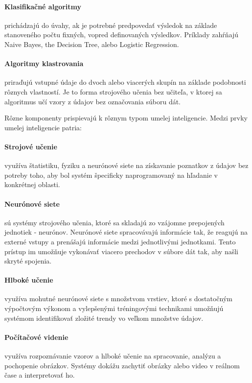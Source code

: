 \paragraph{Klasifikačné algoritmy} prichádzajú do úvahy, ak je potrebné predpovedať výsledok na základe stanoveného počtu fixných, vopred definovaných výsledkov. Príklady zahŕňajú Naive Bayes, the Decision Tree, alebo Logistic Regression.

\paragraph{Algoritmy klastrovania} priraďujú vstupné údaje do dvoch alebo viacerých skupín na základe podobnosti rôznych vlastností. Je to forma strojového učenia bez učiteľa, v ktorej sa algoritmus učí vzory z údajov bez označovania súboru dát.

Rôzne komponenty prispievajú k rôznym typom umelej inteligencie. Medzi prvky umelej inteligencie patria:
\paragraph{Strojové učenie} využíva štatistiku, fyziku a neurónové siete na získavanie poznatkov z údajov bez potreby toho, aby bol systém špecificky naprogramovaný na hľadanie v konkrétnej oblasti.

\paragraph{Neurónové siete} sú systémy strojového učenia, ktoré sa skladajú zo vzájomne prepojených jednotiek - neurónov. Neurónové siete spracovávajú informácie tak, že reagujú na externé vstupy a prenášajú informácie medzi jednotlivými jednotkami. Tento prístup im umožňuje vykonávať viacero prechodov v súbore dát tak, aby našli skryté spojenia.

\paragraph{Hlboké učenie} využíva mohutné neurónové siete s množstvom vrstiev, ktoré s dostatočným výpočtovým výkonom a vylepšenými tréningovými technikami umožňujú systémom identifikovať zložité trendy vo veľkom množstve údajov.

\paragraph{Počítačové videnie} využíva rozpoznávanie vzorov a hlboké učenie na spracovanie, analýzu a pochopenie obrázkov. Systémy dokážu zachytiť obrázky alebo video v reálnom čase a interpretovať ho.

